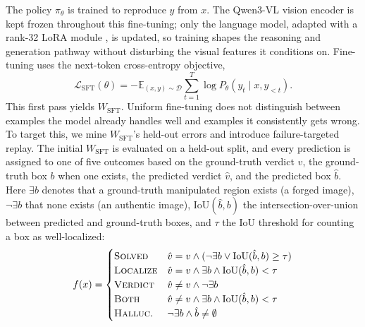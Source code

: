 \documentclass[10pt,twocolumn,letterpaper]{article}
\begin{document}
The policy $\pi_\theta$ is trained to reproduce $y$ from $x$. The Qwen3-VL vision encoder is kept frozen throughout this fine-tuning; only the language model, adapted with a rank-32 LoRA module \cite{lora2021}, is updated, so training shapes the reasoning and generation pathway without disturbing the visual features it conditions on. Fine-tuning uses the next-token cross-entropy objective,
\begin{equation}
\mathcal{L}_{\mathrm{SFT}}(\theta) = -\mathbb{E}_{(x,y)\sim\mathcal{D}}\sum_{t=1}^{T}\log P_\theta(y_t \mid x, y_{<t}).
\label{eq:sft}
\end{equation}
This first pass yields  $W_{\mathrm{SFT}}$. Uniform fine-tuning does not distinguish between examples the model already handles well and examples it consistently gets wrong. To target this, we mine $W_{\mathrm{SFT}}$'s held-out errors and introduce failure-targeted replay. The initial $W_{\mathrm{SFT}}$ is evaluated on a held-out split, and every prediction is assigned to one of five outcomes based on the ground-truth verdict $v$, the ground-truth box $b$ when one exists, the predicted verdict $\hat v$, and the predicted box $\hat b$. Here $\exists b$ denotes that a ground-truth manipulated region exists (a forged image), $\lnot\exists b$ that none exists (an authentic image), $\mathrm{IoU}(\hat b,b)$ the intersection-over-union between predicted and ground-truth boxes, and $\tau$ the IoU threshold for counting a box as well-localized:
\begin{equation}
f(x) = \begin{cases}
\textsc{Solved} & \hat v = v \wedge (\lnot\exists b \vee \mathrm{IoU}(\hat b, b) \ge \tau) \\
\textsc{Localize} & \hat v = v \wedge \exists b \wedge \mathrm{IoU}(\hat b, b) < \tau \\
\textsc{Verdict} & \hat v \ne v \wedge \lnot\exists b \\
\textsc{Both} & \hat v \ne v \wedge \exists b \wedge \mathrm{IoU}(\hat b,b) < \tau\\
\textsc{Halluc.} & \lnot\exists b \wedge \hat b \ne \emptyset
\end{cases}
\label{eq:failure}
\end{equation}
\end{document}
